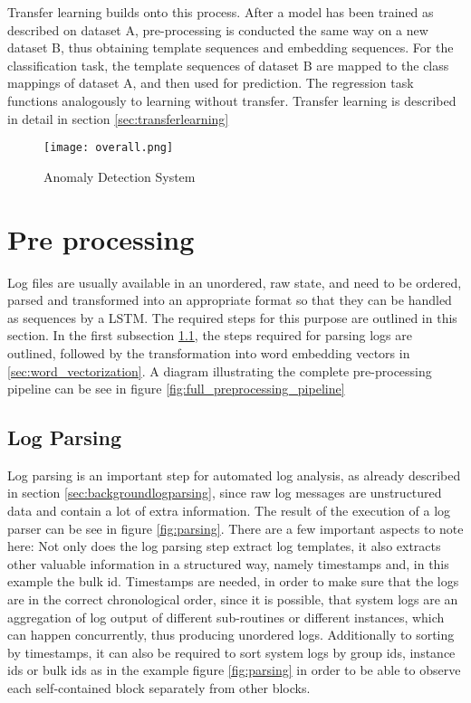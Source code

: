Transfer learning builds onto this process. After a model has been trained as described on dataset A, pre-processing is conducted the same way on a new dataset B, thus obtaining template sequences and embedding sequences. For the classification task, the template sequences of dataset B are mapped to the class mappings of dataset A, and then used for prediction. The regression task functions analogously to learning without transfer. Transfer learning is described in detail in section \ref{sec:transferlearning}

\begin{figure}[H]
	\centering
	\texttt{[image: overall.png]}
	\caption{Anomaly Detection System}
	\label{fig:overall_system}
\end{figure}

\section{Pre processing \label{sec:pre_processing}}
Log files are usually available in an unordered, raw state, and need to be ordered, parsed and transformed into an appropriate format so that they can be handled as sequences by a LSTM. The required steps for this purpose are outlined in this section. In the first subsection \ref{sec:conceptlogparsing}, the steps required for parsing logs are outlined, followed by the transformation into word embedding vectors in \ref{sec:word_vectorization}. A diagram illustrating the complete pre-processing pipeline can be see in figure \ref{fig:full_preprocessing_pipeline}

\subsection{Log Parsing}\label{sec:conceptlogparsing}
Log parsing is an important step for automated log analysis, as already described in section \ref{sec:backgroundlogparsing}, since raw log messages are unstructured data and contain a lot of extra information. The result of the execution of a log parser can be see in figure \ref{fig:parsing}. There are a few important aspects to note here: Not only does the log parsing step extract log templates, it also extracts other valuable information in a structured way, namely timestamps and, in this example the bulk id. Timestamps are needed, in order to make sure that the logs are in the correct chronological order, since it is possible, that system logs are an aggregation of log output of different sub-routines or different instances, which can happen concurrently, thus producing unordered logs. Additionally to sorting by timestamps, it can also be required to sort system logs by group ids, instance ids or bulk ids as in the example figure \ref{fig:parsing} in order to be able to observe each self-contained block separately from other blocks.

